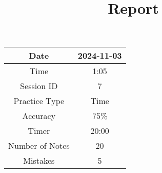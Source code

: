 \documentclass{article}
\date{}
\title{Report}
\begin{document}
\maketitle
\centering\begin{tabular}{|c|c|}
\hline
Date & 2024-11-03\\
\hline
Time & 1:05\\
\hline
Session ID & 7\\
\hline
Practice Type & Time\\
\hline
Accuracy & 75\%\\
\hline
Timer & 20:00\\
\hline
Number of Notes & 20\\
\hline
Mistakes & 5\\
\hline
\end{tabular}
\end{document}
